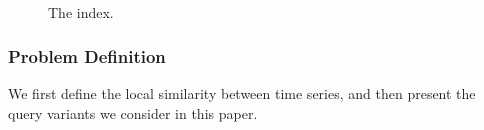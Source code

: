\begin{figure}[!t]
 \centering
\begin{minipage}[!t]{0.5\linewidth}
 \end{minipage}
\begin{minipage}[!t]{0.4\linewidth}
 \\
\end{minipage}
 \vspace{-10pt}
\caption{The \btsr index.}
\label{fig:example}
\end{figure}

\subsubsection{Problem Definition}
\label{subsec:prob_def}

We first define the local similarity between time series, and then present the query variants we consider in this paper.



